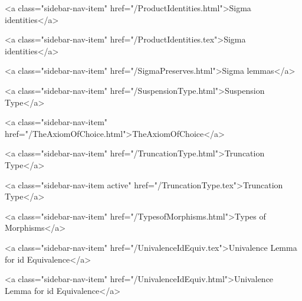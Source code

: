       
    
      
        
          <a class="sidebar-nav-item" href="/ProductIdentities.html">Sigma identities</a>
        
      
    
      
        
          <a class="sidebar-nav-item" href="/ProductIdentities.tex">Sigma identities</a>
        
      
    
      
        
          <a class="sidebar-nav-item" href="/SigmaPreserves.html">Sigma lemmas</a>
        
      
    
      
        
          <a class="sidebar-nav-item" href="/SuspensionType.html">Suspension Type</a>
        
      
    
      
        
          <a class="sidebar-nav-item" href="/TheAxiomOfChoice.html">TheAxiomOfChoice</a>
        
      
    
      
        
          <a class="sidebar-nav-item" href="/TruncationType.html">Truncation Type</a>
        
      
    
      
        
          <a class="sidebar-nav-item active" href="/TruncationType.tex">Truncation Type</a>
        
      
    
      
        
          <a class="sidebar-nav-item" href="/TypesofMorphisms.html">Types of Morphisms</a>
        
      
    
      
        
          <a class="sidebar-nav-item" href="/UnivalenceIdEquiv.tex">Univalence Lemma for id Equivalence</a>
        
      
    
      
        
          <a class="sidebar-nav-item" href="/UnivalenceIdEquiv.html">Univalence Lemma for id Equivalence</a>
        
      
    
      
        
